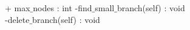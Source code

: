 {
+ max$\_$nodes : int
}
{
-find$\_$small$\_$branch(self) : void \\
-delete$\_$branch(self) : void 
}
